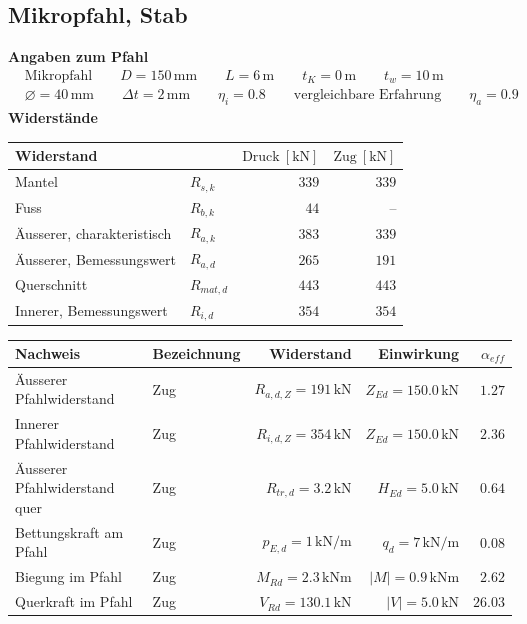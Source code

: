 \documentclass[11pt,a4paper]{article}
\begin{document}
\subsection{Mikropfahl, Stab}
\noindent\textbf{Angaben zum Pfahl}
\begin{equation*}
\begin{aligned} & \text{Mikropfahl} \qquad D = 150\,\mathrm{mm} \qquad L = 6\,\mathrm{m} \qquad t_K = 0\,\mathrm{m} \qquad t_w = 10\,\mathrm{m} \\ & \varnothing = 40\,\mathrm{mm} \qquad \Delta t = 2\,\mathrm{mm} \qquad \eta_i = 0.8 \qquad \text{vergleichbare Erfahrung} \qquad \eta_a = 0.9 \end{aligned}
\end{equation*}
\noindent\textbf{Widerstände}
\begin{longtable}{llrr}
\hline
Widerstand &  & $\text{Druck}\ [\mathrm{kN}]$ & $\text{Zug}\ [\mathrm{kN}]$ \\
\hline
\endhead
Mantel & $R_{s,k}$ & $339$ & $339$ \\
Fuss & $R_{b,k}$ & $44$ & – \\
Äusserer, charakteristisch & $R_{a,k}$ & $383$ & $339$ \\
Äusserer, Bemessungswert & $R_{a,d}$ & $265$ & $191$ \\
Querschnitt & $R_{mat,d}$ & $443$ & $443$ \\
Innerer, Bemessungswert & $R_{i,d}$ & $354$ & $354$ \\
\hline
\end{longtable}
\begin{xltabular}{\linewidth}{>{\raggedright\arraybackslash}X>{\raggedright\arraybackslash}Xrrr}
\hline
Nachweis & Bezeichnung & Widerstand & Einwirkung & $\alpha_{eff}$ \\
\hline
\endhead
Äusserer Pfahlwiderstand & Zug & $R_{a,d,Z} = 191\,\mathrm{kN}$ & $Z_{Ed} = 150.0\,\mathrm{kN}$ & $1.27$ \\
Innerer Pfahlwiderstand & Zug & $R_{i,d,Z} = 354\,\mathrm{kN}$ & $Z_{Ed} = 150.0\,\mathrm{kN}$ & $2.36$ \\
Äusserer Pfahlwiderstand quer & Zug & $R_{tr,d} = 3.2\,\mathrm{kN}$ & $H_{Ed} = 5.0\,\mathrm{kN}$ & $0.64$ \\
Bettungskraft am Pfahl & Zug & $p_{E,d} = 1\,\mathrm{kN}/\mathrm{m}$ & $q_d = 7\,\mathrm{kN}/\mathrm{m}$ & $0.08$ \\
Biegung im Pfahl & Zug & $M_{Rd} = 2.3\,\mathrm{kNm}$ & $\left|M\right| = 0.9\,\mathrm{kNm}$ & $2.62$ \\
Querkraft im Pfahl & Zug & $V_{Rd} = 130.1\,\mathrm{kN}$ & $\left|V\right| = 5.0\,\mathrm{kN}$ & $26.03$ \\
\hline
\end{xltabular}
\end{document}
